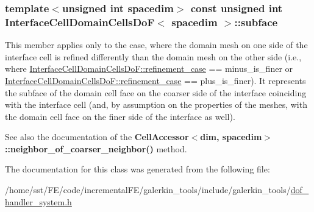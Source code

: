 \subsubsection[{\texorpdfstring{subface}{subface}}]{\setlength{\rightskip}{0pt plus 5cm}template$<$unsigned int spacedim$>$ const unsigned int {\bf Interface\+Cell\+Domain\+Cells\+DoF}$<$ spacedim $>$\+::subface}\hypertarget{class_interface_cell_domain_cells_do_f_ac0f33cbe60afdc4f5856ea39a085ed1a}{}\label{class_interface_cell_domain_cells_do_f_ac0f33cbe60afdc4f5856ea39a085ed1a}
This member applies only to the case, where the domain mesh on one side of the interface cell is refined differently than the domain mesh on the other side (i.\+e., where \hyperlink{class_interface_cell_domain_cells_do_f_aebb7e5f13d079fc83f98f67bcfcc6de3}{Interface\+Cell\+Domain\+Cells\+Do\+F\+::refinement\+\_\+case} == {\ttfamily minus\+\_\+is\+\_\+finer} or \hyperlink{class_interface_cell_domain_cells_do_f_aebb7e5f13d079fc83f98f67bcfcc6de3}{Interface\+Cell\+Domain\+Cells\+Do\+F\+::refinement\+\_\+case} == {\ttfamily plus\+\_\+is\+\_\+finer}). It represents the subface of the domain cell face on the coarser side of the interface coinciding with the interface cell (and, by assumption on the properties of the meshes, with the domain cell face on the finer side of the interface as well).

See also the documentation of the {\bf Cell\+Accessor$<$dim, spacedim$>$\+::neighbor\+\_\+of\+\_\+coarser\+\_\+neighbor()} method. 

The documentation for this class was generated from the following file\+:\begin{DoxyCompactItemize}
\item 
/home/sst/\+F\+E/code/incremental\+F\+E/galerkin\+\_\+tools/include/galerkin\+\_\+tools/\hyperlink{dof__handler__system_8h}{dof\+\_\+handler\+\_\+system.\+h}\end{DoxyCompactItemize}
